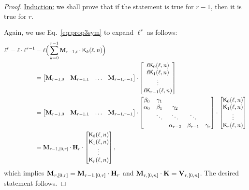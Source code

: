 \documentclass[11pt]{llncs}
\begin{document}
\begin{proof}
	\bigskip

	\underline{Induction:} we shall prove that if the statement is true for $r-1$, then it is true for $r$.

	Again, we use Eq.~\eqref{eq:prop3sym} to expand $\ell^{r}$ as follows:
	\begin{equation*}
	\begin{split}
	\ell^{r} = \ell \cdot \ell^{r-1} &= \ell \Big( \sum_{k=0}^{r-1}\mathbf{M}_{r-1,i} \cdot \mathsf{K}_{k}(\ell,n)\Big)
	\\& = \begin{bmatrix}\mathbf{M}_{r-1,0} & \mathbf{M}_{r-1,1} & \ldots & \mathbf{M}_{r-1,r-1}\end{bmatrix} \cdot \begin{bmatrix}\ell \mathsf{K}_{0}(\ell,n)\\ \ell  \mathsf{K}_{1}(\ell,n)\\\vdots\\ \ell \mathsf{K}_{r-1}(\ell,n)\end{bmatrix}
	\\  &= \begin{bmatrix}\mathbf{M}_{r-1,0} & \mathbf{M}_{r-1,1} & \ldots & \mathbf{M}_{r-1,r-1}\end{bmatrix} \cdot \begin{bmatrix}\beta_0 & \gamma_1\\\alpha_0 & \beta_1 & \gamma_2 & & \\ & \ddots & \ddots & \ddots\\ & & \alpha_{r-2} & \beta_{r-1} & \gamma_{r}\end{bmatrix} \cdot \begin{bmatrix}\mathsf{K}_{0}(\ell,n)\\\mathsf{K}_{1}(\ell,n)\\\vdots\\\mathsf{K}_{r}(\ell,n)\end{bmatrix}
	\\&= \mathbf{M}_{r-1,[0,r]}\cdot \mathbf{H}_r \cdot \begin{bmatrix}\mathsf{K}_{0}(\ell,n)\\\mathsf{K}_{1}(\ell,n)\\\vdots\\\mathsf{K}_{r}(\ell,n)\end{bmatrix},
	\end{split}
	\end{equation*}
	which implies $\mathbf{M}_{r,[0,r]} = \mathbf{M}_{r-1,[0,r]}\cdot \mathbf{H}_r$ and $\mathbf{M}_{r,[0,n]} \cdot \mathbf{K} = \mathbf{V}_{r,[0,n]}$. The desired statement follows.
\end{proof}
\end{document}
